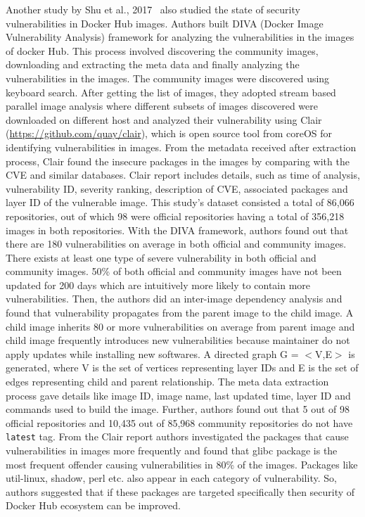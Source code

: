 Another study by Shu et al., 2017~\cite{Shu2017} also studied the state of security
vulnerabilities in Docker Hub images.
Authors built DIVA (Docker Image Vulnerability Analysis) framework for analyzing 
the vulnerabilities in the images of docker Hub. This process involved discovering 
the community images, downloading and extracting the meta data and finally analyzing 
the vulnerabilities in the images. The community images were discovered using 
keyboard search. After getting the list of images, they adopted stream based 
parallel image analysis where different subsets of images discovered were 
downloaded on different host and analyzed their vulnerability using Clair
(\href{https://github.com/quay/clair}{https://github.com/quay/clair}), 
which is open source tool from coreOS for identifying vulnerabilities in 
images. From the metadata received after extraction process, Clair 
found the insecure packages in the images by comparing with the CVE and similar 
databases. Clair report includes details, such as time of analysis, vulnerability ID, 
severity ranking, description of CVE, associated packages and layer ID of the 
vulnerable image. This study's dataset consisted a total of 86,066 repositories, out of 
which 98 were official repositories having a total of 356,218 images in both 
repositories. With the DIVA framework, authors found out that there are 180 
vulnerabilities on average in both official and community images. There 
exists at least one type of severe vulnerability in both official and 
community images. 50\% of both official and community images have not 
been updated for 200 days which are intuitively more likely 
to contain more vulnerabilities.
Then, the authors did an inter-image dependency analysis and found 
that vulnerability propagates from the parent image to the child image. 
A child image inherits 80 or more vulnerabilities on average from parent 
image and child image frequently introduces new vulnerabilities because 
maintainer do not apply updates while installing new softwares.  
A directed graph G = \(<\)V,E\(>\) is generated, where V is the set of vertices 
representing layer IDs and E is the set of edges representing child and 
parent relationship. The meta data extraction process gave details like 
image ID, image name, last updated time, layer ID and commands used to 
build the image. 
Further, authors found out that 5 out of 98 official repositories and 10,435 out 
of 85,968 community repositories do not have \texttt{latest} tag.  From the Clair report 
authors investigated the packages that cause vulnerabilities in images more 
frequently and found that glibc package is the most frequent offender causing 
vulnerabilities in 80\% of the images. Packages like util-linux, shadow, perl etc. 
also appear in each category of vulnerability. So, authors suggested that if 
these packages are targeted specifically then security of Docker Hub ecosystem 
can be improved.


